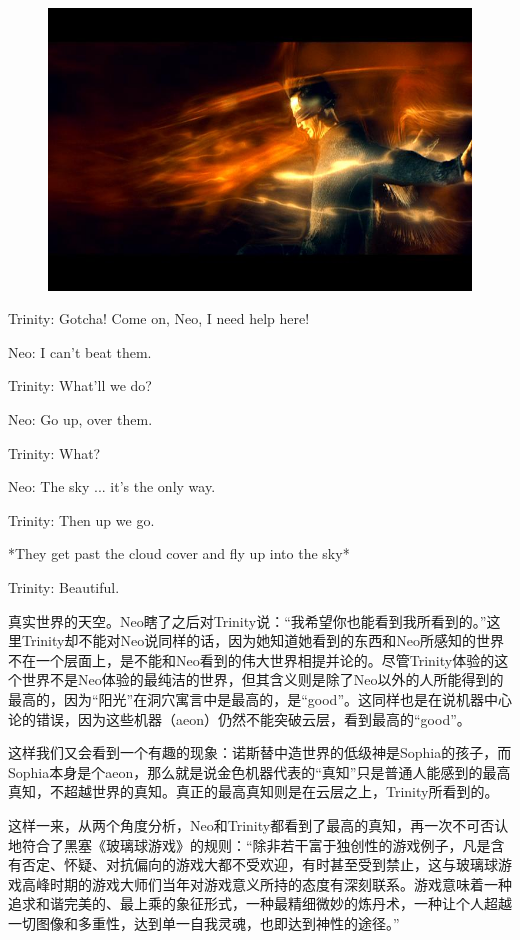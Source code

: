 \documentclass[UTF8]{ctexart}
\newenvironment{myquote}{\color{green} \setlength{\leftskip}{6em} \setlength{\rightskip}{4em} \setlength{\parindent}{-2em}}{\par}
\begin{document}
\begin{figure}[htb]
\centering
\includegraphics[width=0.5\linewidth]{fig/b3f558eeabe247fab2fb9597.jpg}
\end{figure}

\begin{myquote}
Trinity: Gotcha! Come on, Neo, I need help here!

Neo: I can't beat them.

Trinity: What'll we do?

Neo: Go up, over them.

Trinity: What?

Neo: The sky ... it's the only way.

Trinity: Then up we go.

*They get past the cloud cover and fly up into the sky*

Trinity: Beautiful.
\end{myquote}

真实世界的天空。Neo瞎了之后对Trinity说：“我希望你也能看到我所看到的。”这里Trinity却不能对Neo说同样的话，因为她知道她看到的东西和Neo所感知的世界不在一个层面上，是不能和Neo看到的伟大世界相提并论的。尽管Trinity体验的这个世界不是Neo体验的最纯洁的世界，但其含义则是除了Neo以外的人所能得到的最高的，因为“阳光”在洞穴寓言中是最高的，是“good”。这同样也是在说机器中心论的错误，因为这些机器（aeon）仍然不能突破云层，看到最高的“good”。

这样我们又会看到一个有趣的现象：诺斯替中造世界的低级神是Sophia的孩子，而Sophia本身是个aeon，那么就是说金色机器代表的“真知”只是普通人能感到的最高真知，不超越世界的真知。真正的最高真知则是在云层之上，Trinity所看到的。

这样一来，从两个角度分析，Neo和Trinity都看到了最高的真知，再一次不可否认地符合了黑塞《玻璃球游戏》的规则：“除非若干富于独创性的游戏例子，凡是含有否定、怀疑、对抗偏向的游戏大都不受欢迎，有时甚至受到禁止，这与玻璃球游戏高峰时期的游戏大师们当年对游戏意义所持的态度有深刻联系。游戏意味着一种追求和谐完美的、最上乘的象征形式，一种最精细微妙的炼丹术，一种让个人超越一切图像和多重性，达到单一自我灵魂，也即达到神性的途径。”
\end{document}
